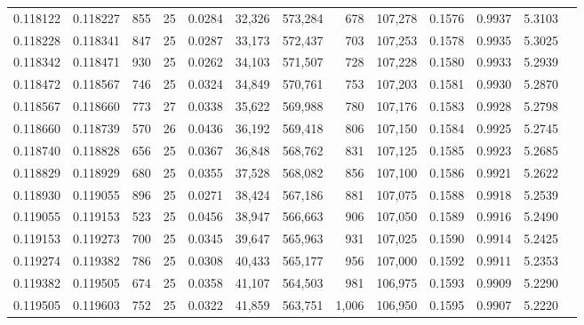 \begin{tabular}{rrrrrrrrrrrrr}
0.118122 & 0.118227 &   855 &  25 &                                     0.0284 &  32,326 & 573,284 &     678 & 107,278 & 0.1576 & 0.9937 & 5.3103 \\
0.118228 & 0.118341 &   847 &  25 &                                     0.0287 &  33,173 & 572,437 &     703 & 107,253 & 0.1578 & 0.9935 & 5.3025 \\
0.118342 & 0.118471 &   930 &  25 &                                     0.0262 &  34,103 & 571,507 &     728 & 107,228 & 0.1580 & 0.9933 & 5.2939 \\
0.118472 & 0.118567 &   746 &  25 &                                     0.0324 &  34,849 & 570,761 &     753 & 107,203 & 0.1581 & 0.9930 & 5.2870 \\
0.118567 & 0.118660 &   773 &  27 &                                     0.0338 &  35,622 & 569,988 &     780 & 107,176 & 0.1583 & 0.9928 & 5.2798 \\
0.118660 & 0.118739 &   570 &  26 &                                     0.0436 &  36,192 & 569,418 &     806 & 107,150 & 0.1584 & 0.9925 & 5.2745 \\
0.118740 & 0.118828 &   656 &  25 &                                     0.0367 &  36,848 & 568,762 &     831 & 107,125 & 0.1585 & 0.9923 & 5.2685 \\
0.118829 & 0.118929 &   680 &  25 &                                     0.0355 &  37,528 & 568,082 &     856 & 107,100 & 0.1586 & 0.9921 & 5.2622 \\
0.118930 & 0.119055 &   896 &  25 &                                     0.0271 &  38,424 & 567,186 &     881 & 107,075 & 0.1588 & 0.9918 & 5.2539 \\
0.119055 & 0.119153 &   523 &  25 &                                     0.0456 &  38,947 & 566,663 &     906 & 107,050 & 0.1589 & 0.9916 & 5.2490 \\
0.119153 & 0.119273 &   700 &  25 &                                     0.0345 &  39,647 & 565,963 &     931 & 107,025 & 0.1590 & 0.9914 & 5.2425 \\
0.119274 & 0.119382 &   786 &  25 &                                     0.0308 &  40,433 & 565,177 &     956 & 107,000 & 0.1592 & 0.9911 & 5.2353 \\
0.119382 & 0.119505 &   674 &  25 &                                     0.0358 &  41,107 & 564,503 &     981 & 106,975 & 0.1593 & 0.9909 & 5.2290 \\
0.119505 & 0.119603 &   752 &  25 &                                     0.0322 &  41,859 & 563,751 &   1,006 & 106,950 & 0.1595 & 0.9907 & 5.2220 \\

\end{tabular}
